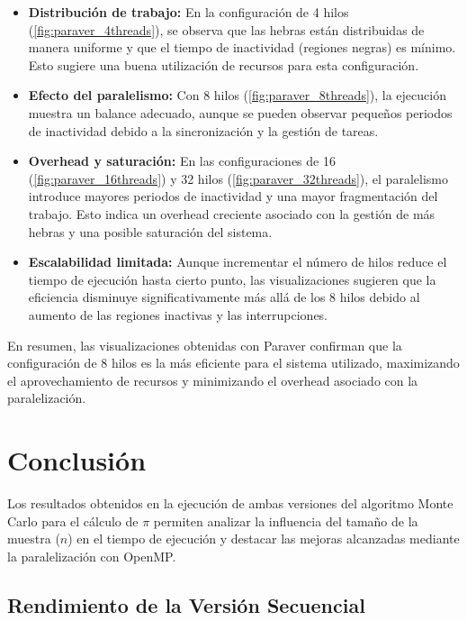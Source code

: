 \documentclass[a4paper, 10pt, onecolumn]{IEEEtran}
\begin{document}
\begin{itemize}
  \item \textbf{Distribución de trabajo:} En la configuración de 4 hilos (\cref{fig:paraver_4threads}), se observa que las hebras están distribuidas de manera uniforme y que el tiempo de inactividad (regiones negras) es mínimo. Esto sugiere una buena utilización de recursos para esta configuración.
  
  \item \textbf{Efecto del paralelismo:} Con 8 hilos (\cref{fig:paraver_8threads}), la ejecución muestra un balance adecuado, aunque se pueden observar pequeños periodos de inactividad debido a la sincronización y la gestión de tareas.
  
  \item \textbf{Overhead y saturación:} En las configuraciones de 16 (\cref{fig:paraver_16threads}) y 32 hilos (\cref{fig:paraver_32threads}), el paralelismo introduce mayores periodos de inactividad y una mayor fragmentación del trabajo. Esto indica un overhead creciente asociado con la gestión de más hebras y una posible saturación del sistema.
  
  \item \textbf{Escalabilidad limitada:} Aunque incrementar el número de hilos reduce el tiempo de ejecución hasta cierto punto, las visualizaciones sugieren que la eficiencia disminuye significativamente más allá de los 8 hilos debido al aumento de las regiones inactivas y las interrupciones.
\end{itemize}

En resumen, las visualizaciones obtenidas con Paraver confirman que la configuración de 8 hilos es la más eficiente para el sistema utilizado, maximizando el aprovechamiento de recursos y minimizando el overhead asociado con la paralelización.

\section{Conclusión}

Los resultados obtenidos en la ejecución de ambas versiones del algoritmo Monte Carlo para el cálculo de $\pi$ permiten analizar la influencia del tamaño de la muestra ($n$) en el tiempo de ejecución y destacar las mejoras alcanzadas mediante la paralelización con OpenMP.

\subsection{Rendimiento de la Versión Secuencial}
\end{document}
